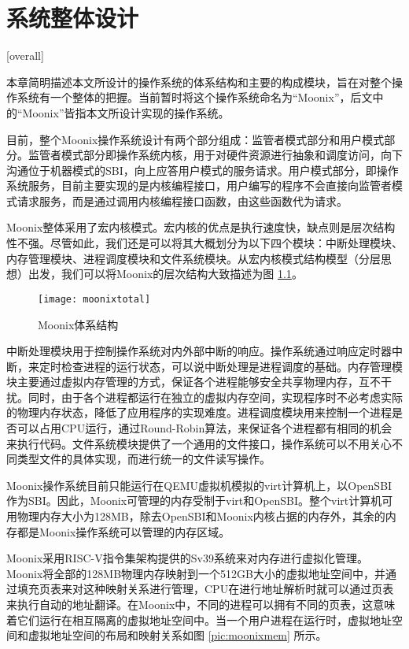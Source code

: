 
\chapter{系统整体设计}[overall]
\label{chapter:overall}

本章简明描述本文所设计的操作系统的体系结构和主要的构成模块，旨在对整个操作系统有一个整体的把握。当前暂时将这个操作系统命名为“Moonix”，后文中的“Moonix”皆指本文所设计实现的操作系统。

目前，整个Moonix操作系统设计有两个部分组成：监管者模式部分和用户模式部分。监管者模式部分即操作系统内核，用于对硬件资源进行抽象和调度访问，向下沟通位于机器模式的SBI，向上应答用户模式的服务请求。用户模式部分，即操作系统服务，目前主要实现的是内核编程接口，用户编写的程序不会直接向监管者模式请求服务，而是通过调用内核编程接口函数，由这些函数代为请求。

Moonix整体采用了宏内核模式。宏内核的优点是执行速度快，缺点则是层次结构性不强。尽管如此，我们还是可以将其大概划分为以下四个模块：中断处理模块、内存管理模块、进程调度模块和文件系统模块。从宏内核模式结构模型（分层思想）出发，我们可以将Moonix的层次结构大致描述为图 \ref{pic:moonixtotal}。

\begin{figure}[htpb]
	\centering
	\texttt{[image: moonixtotal]}
	\setlength{\abovecaptionskip}{2pt}
	\caption{Moonix体系结构}
	\label{pic:moonixtotal}
\end{figure}

中断处理模块用于控制操作系统对内外部中断的响应。操作系统通过响应定时器中断，来定时检查进程的运行状态，可以说中断处理是进程调度的基础。内存管理模块主要通过虚拟内存管理的方式，保证各个进程能够安全共享物理内存，互不干扰。同时，由于各个进程都运行在独立的虚拟内存空间，实现程序时不必考虑实际的物理内存状态，降低了应用程序的实现难度。进程调度模块用来控制一个进程是否可以占用CPU运行，通过Round-Robin算法\cite{DBLP:journals/eor/RasmussenT08}，来保证各个进程都有相同的机会来执行代码。文件系统模块提供了一个通用的文件接口，操作系统可以不用关心不同类型文件的具体实现，而进行统一的文件读写操作。

Moonix操作系统目前只能运行在QEMU虚拟机模拟的virt计算机上\cite{qemu/virt}，以OpenSBI作为SBI。因此，Moonix可管理的内存受制于virt和OpenSBI。整个virt计算机可用物理内存大小为128MB，除去OpenSBI和Moonix内核占据的内存外，其余的内存都是Moonix操作系统可以管理的内存区域。

Moonix采用RISC-V指令集架构提供的Sv39系统来对内存进行虚拟化管理。Moonix将全部的128MB物理内存映射到一个512GB大小的虚拟地址空间中，并通过填充页表来对这种映射关系进行管理，CPU在进行地址解析时就可以通过页表来执行自动的地址翻译。在Moonix中，不同的进程可以拥有不同的页表，这意味着它们运行在相互隔离的虚拟地址空间中。当一个用户进程在运行时，虚拟地址空间和虚拟地址空间的布局和映射关系如图 \ref{pic:moonixmem} 所示。

